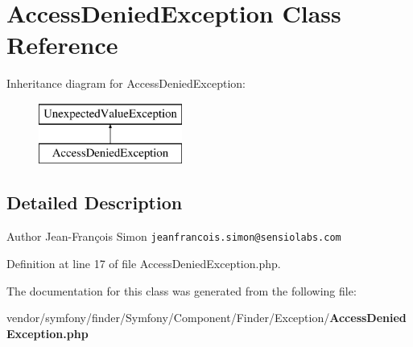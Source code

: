 \section{Access\+Denied\+Exception Class Reference}
\label{class_symfony_1_1_component_1_1_finder_1_1_exception_1_1_access_denied_exception}
Inheritance diagram for Access\+Denied\+Exception\+:\begin{figure}[H]
\begin{center}
\leavevmode
\includegraphics[height=2.000000cm]{class_symfony_1_1_component_1_1_finder_1_1_exception_1_1_access_denied_exception}
\end{center}
\end{figure}


\subsection{Detailed Description}
\begin{DoxyAuthor}{Author}
Jean-\/\+François Simon {\tt jeanfrancois.\+simon@sensiolabs.\+com} 
\end{DoxyAuthor}


Definition at line 17 of file Access\+Denied\+Exception.\+php.



The documentation for this class was generated from the following file\+:\begin{DoxyCompactItemize}
\item 
vendor/symfony/finder/\+Symfony/\+Component/\+Finder/\+Exception/{\bf Access\+Denied\+Exception.\+php}\end{DoxyCompactItemize}
